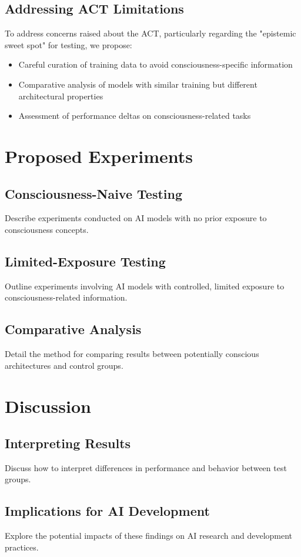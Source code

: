 \documentclass{article}
\begin{document}
\subsection{Addressing ACT Limitations}
To address concerns raised about the ACT, particularly regarding the "epistemic sweet spot" for testing, we propose:
\begin{itemize}
    \item Careful curation of training data to avoid consciousness-specific information
    \item Comparative analysis of models with similar training but different architectural properties
    \item Assessment of performance deltas on consciousness-related tasks
\end{itemize}

\section{Proposed Experiments}
\subsection{Consciousness-Naive Testing}
Describe experiments conducted on AI models with no prior exposure to consciousness concepts.

\subsection{Limited-Exposure Testing}
Outline experiments involving AI models with controlled, limited exposure to consciousness-related information.

\subsection{Comparative Analysis}
Detail the method for comparing results between potentially conscious architectures and control groups.

\section{Discussion}
\subsection{Interpreting Results}
Discuss how to interpret differences in performance and behavior between test groups.

\subsection{Implications for AI Development}
Explore the potential impacts of these findings on AI research and development practices.
\end{document}
